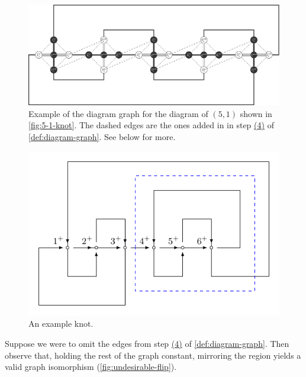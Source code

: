 \begin{landscape}
  \begin{figure}[H]
    \centering
    \includegraphics[scale=.9]{figures/unknotting-moves-and-combinatorial-representations/5-1-knot-graph.pdf}
    \caption[$(5,1)$ diagram graph]{Example of the diagram graph for
      the diagram of $(5,1)$ shown in \cref{fig:5-1-knot}. The dashed
      edges are the ones added in in step
      \hyperlink{graph-step-4}{(4)} of \cref{def:diagram-graph}. See
      below for more.}
    \label{fig:ex-knot-graph}
  \end{figure}
\end{landscape}
\begin{figure}[H]
  \centering
  \includegraphics[scale=.7]{figures/unknotting-moves-and-combinatorial-representations/3-1-csum-boxed.pdf}
  \caption{An example knot.}
  \label{fig:graph-def-motivation}
\end{figure}
Suppose we were to omit the edges from step
\hyperlink{graph-step-4}{(4)} of \cref{def:diagram-graph}. Then
observe that, holding the rest of the graph constant, mirroring the
region yields a valid graph isomorphism (\cref{fig:undesirable-flip}).
